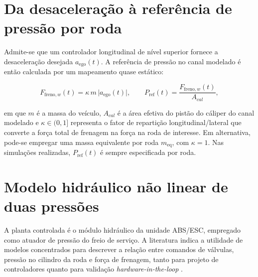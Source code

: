 \section{Da desaceleração à referência de pressão por roda}
\label{sec:mapeamento-aref-pressao}
Admite-se que um controlador longitudinal de nível superior fornece a desaceleração desejada $a_{\mathrm{ego}}(t)$. A referência de pressão no canal modelado é então calculada por um mapeamento quase estático:

\begin{equation}
    F_{\mathrm{freno},w}(t) = \kappa\, m\,\big|a_{\mathrm{ego}}(t)\big|,
    \qquad
    P_{\mathrm{ref}}(t) = \frac{F_{\mathrm{freno},w}(t)}{A_{cal}},
    \label{eq:mapeamento_aref_pressao}
\end{equation}

em que $m$ é a massa do veículo, $A_{cal}$ é a área efetiva do pistão do cáliper do canal modelado e $\kappa\in(0,1]$ representa o fator de repartição longitudinal/lateral que converte a força total de frenagem na força na roda de interesse. Em alternativa, pode-se empregar uma massa equivalente por roda $m_{\mathrm{eq}}$, com $\kappa=1$. Nas simulações realizadas, $P_{\mathrm{ref}}(t)$ é sempre especificada por roda.

\section{Modelo hidráulico não linear de duas pressões}
\label{sec:controle-4-1}
A planta controlada é o módulo hidráulico da unidade ABS/ESC, empregado como atuador de pressão do freio de serviço. A literatura indica a utilidade de modelos concentrados para descrever a relação entre comandos de válvulas, pressão no cilindro da roda e força de frenagem, tanto para projeto de controladores quanto para validação \emph{hardware-in-the-loop} \cite{HouhuaJing2022,PressureCoordinatedControl2023,ZengYangHuang2023,MotorParametricDesign2023}.

